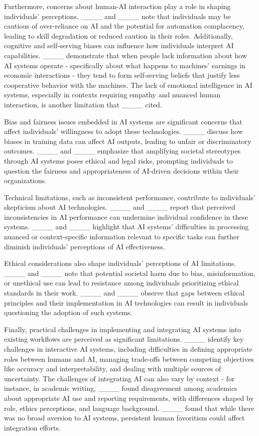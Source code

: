 Furthermore, concerns about human-AI interaction play a role in shaping individuals' perceptions. ____ and ____ note that individuals may be cautious of over-reliance on AI and the potential for automation complacency, leading to skill degradation or reduced caution in their roles. Additionally, cognitive and self-serving biases can influence how individuals interpret AI capabilities. ____ demonstrate that when people lack information about how AI systems operate - specifically about what happens to machines' earnings in economic interactions - they tend to form self-serving beliefs that justify less cooperative behavior with the machines. The lack of emotional intelligence in AI systems, especially in contexts requiring empathy and nuanced human interaction, is another limitation that ____ cited.

Bias and fairness issues embedded in AI systems are significant concerns that affect individuals' willingness to adopt these technologies. ____ discuss how biases in training data can affect AI outputs, leading to unfair or discriminatory outcomes. ____ and ____ emphasize that amplifying societal stereotypes through AI systems poses ethical and legal risks, prompting individuals to question the fairness and appropriateness of AI-driven decisions within their organizations.

Technical limitations, such as inconsistent performance, contribute to individuals' skepticism about AI technologies. ____ and ____ report that perceived inconsistencies in AI performance can undermine individual confidence in these systems. ____ and ____ highlight that AI systems' difficulties in processing nuanced or context-specific information relevant to specific tasks can further diminish individuals' perceptions of AI effectiveness.

Ethical considerations also shape individuals' perceptions of AI limitations. ____ and ____ note that potential societal harm due to bias, misinformation, or unethical use can lead to resistance among individuals prioritizing ethical standards in their work. ____ and ____ observe that gaps between ethical principles and their implementation in AI technologies can result in individuals questioning the adoption of such systems.

Finally, practical challenges in implementing and integrating AI systems into existing workflows are perceived as significant limitations. ____ identify key challenges in interactive AI systems, including difficulties in defining appropriate roles between humans and AI, managing trade-offs between competing objectives like accuracy and interpretability, and dealing with multiple sources of uncertainty. The challenges of integrating AI can also vary by context - for instance, in academic writing, ____ found disagreement among academics about appropriate AI use and reporting requirements, with differences shaped by role, ethics perceptions, and language background. ____ found that while there was no broad aversion to AI systems, persistent human favoritism could affect integration efforts.

